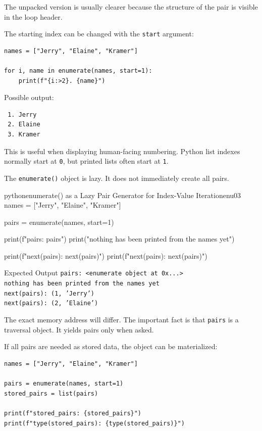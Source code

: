 \documentclass[a4paper,twoside]{report}
\begin{document}
The unpacked version is usually clearer because the structure of the pair is visible in the loop header.

The starting index can be changed with the \texttt{start} argument:

\begin{verbatim}
names = ["Jerry", "Elaine", "Kramer"]

for i, name in enumerate(names, start=1):
    print(f"{i:>2}. {name}")
\end{verbatim}

Possible output:

\begin{verbatim}
 1. Jerry
 2. Elaine
 3. Kramer
\end{verbatim}

This is useful when displaying human-facing numbering. Python list indexes normally start at \texttt{0}, but printed lists often start at \texttt{1}.

The \texttt{enumerate()} object is lazy. It does not immediately create all pairs.

\begin{codebox}[]{python}{enumerate() as a Lazy Pair Generator for Index-Value Iteration}{enu03}
names = ["Jerry", "Elaine", "Kramer"]

pairs = enumerate(names, start=1)

print(f"pairs: {pairs}")
print("nothing has been printed from the names yet")

print(f"next(pairs): {next(pairs)}")
print(f"next(pairs): {next(pairs)}")
\end{codebox}


\begin{iobox}{Expected Output}
\texttt{pairs: <enumerate object at 0x...>} \\
\texttt{nothing has been printed from the names yet} \\
\texttt{next(pairs): (1, 'Jerry')} \\
\texttt{next(pairs): (2, 'Elaine')} \\
\end{iobox}


The exact memory address will differ. The important fact is that \texttt{pairs} is a traversal object. It yields pairs only when asked.

If all pairs are needed as stored data, the object can be materialized:

\begin{verbatim}
names = ["Jerry", "Elaine", "Kramer"]

pairs = enumerate(names, start=1)
stored_pairs = list(pairs)

print(f"stored_pairs: {stored_pairs}")
print(f"type(stored_pairs): {type(stored_pairs)}")
\end{verbatim}
\end{document}

